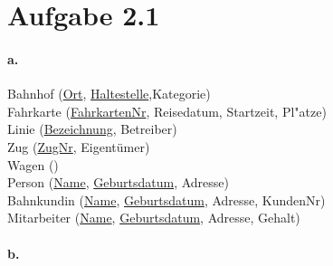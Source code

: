 \documentclass[12pt]{article}
\begin{document}
 	
 	
 	
 	
 	\section*{Aufgabe 2.1}
 	
 	
 	
 	\paragraph*{a.}
 	Bahnhof (\underline{Ort}, \underline{Haltestelle},Kategorie)\\[1.3em]
 	
 	Fahrkarte (\underline{FahrkartenNr}, Reisedatum, Startzeit, Pl"atze)\\[1.3em]
 	
 	Linie (\underline{Bezeichnung}, Betreiber)\\[1.3em]
 	
 	Zug (\underline{ZugNr}, Eigentümer)\\[1.3em]
 	
 	Wagen ()\\[1.3em]
 	
 	Person (\underline{Name}, \underline{Geburtsdatum}, Adresse) \\[1,3em]
 	
 	Bahnkundin (\underline{Name}, \underline{Geburtsdatum}, Adresse, KundenNr)\\[1,3em]
 	
 	Mitarbeiter (\underline{Name}, \underline{Geburtsdatum},  Adresse, Gehalt)\\[1,3em]
 	
 	
 	\paragraph*{b.}	
 	
\end{document}
